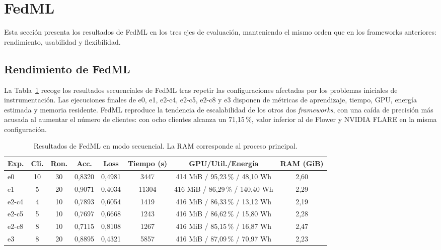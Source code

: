 \section{FedML}\label{sec:fedml}

Esta sección presenta los resultados de FedML en los tres ejes de evaluación,
manteniendo el mismo orden que en los frameworks anteriores: rendimiento,
usabilidad y flexibilidad.

\subsection{Rendimiento de FedML}\label{sec:resultados-fedml}

La Tabla~\ref{tab:fedml-seq} recoge los resultados secuenciales de FedML tras repetir las
configuraciones afectadas por los problemas iniciales de instrumentación. Las ejecuciones
finales de e0, e1, e2-c4, e2-c5, e2-c8 y e3 disponen de métricas de aprendizaje, tiempo, GPU,
energía estimada y memoria residente. FedML reproduce la tendencia de escalabilidad de los otros
dos \textit{frameworks}, con una caída de precisión más acusada al aumentar el número de
clientes: con ocho clientes alcanza un 71{,}15\,\%, valor inferior al de Flower y NVIDIA FLARE en
la misma configuración.

\begin{table}[htbp]
  \centering
  \footnotesize
  \setlength{\tabcolsep}{4pt}
  \caption{Resultados de FedML en modo secuencial. La RAM corresponde al proceso principal.}
  \label{tab:fedml-seq}
  \begin{tabular}{lccccccc}
    \toprule
    Exp. & Cli. & Ron. & Acc. & Loss & Tiempo (s) & GPU/Util./Energía & RAM (GiB) \\
    \midrule
    e0    & 10 & 30 & 0,8320 & 0,4981 & 3447  & 414 MiB / 95,23\,\% / 48,10 Wh  & 2,60 \\
    e1    & 5  & 20 & 0,9071 & 0,4034 & 11304 & 416 MiB / 86,29\,\% / 140,40 Wh & 2,29 \\
    e2-c4 & 4  & 10 & 0,7893 & 0,6054 & 1419  & 416 MiB / 86,33\,\% / 13,12 Wh  & 2,19 \\
    e2-c5 & 5  & 10 & 0,7697 & 0,6668 & 1243  & 416 MiB / 86,62\,\% / 15,80 Wh  & 2,28 \\
    e2-c8 & 8  & 10 & 0,7115 & 0,8108 & 1267  & 416 MiB / 85,15\,\% / 16,87 Wh  & 2,47 \\
    e3    & 8  & 20 & 0,8895 & 0,4321 & 5857  & 416 MiB / 87,09\,\% / 70,97 Wh  & 2,23 \\
    \bottomrule
  \end{tabular}
\end{table}

